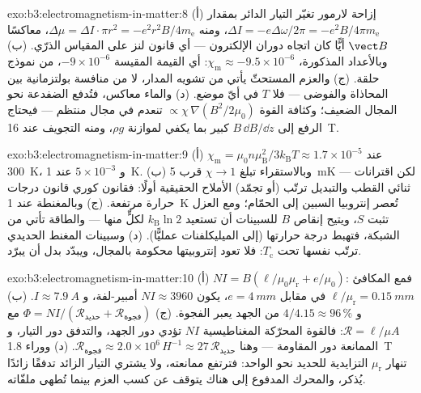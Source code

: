 \begin{solution}{exo:b3:electromagnetism-in-matter:8}
(أ) إزاحة لارمور تغيّر التيار الدائر بمقدار $\Delta I
= -e\Delta\omega/2\pi = -e^2B/4\pi m_{\text{e}}$، ومنه
$\Delta\mu = \Delta I\cdot\pi r^2 = -e^2r^2B/4m_{\text{e}}$،
معاكسًا $\vect B$ أيًّا كان اتجاه دوران الإلكترون ---
أي قانون لنز على المقياس الذرّي. (ب) وبالأعداد المذكورة،
$\chi_{\text{m}} \approx -9.5\times10^{-6}$: أي القيمة المقيسة
$-9\times10^{-6}$، من نموذج حلقة. (ج) والعزم المستحثّ
يأتي من تشويه المدار، لا من منافسة بولتزمانية
بين المحاذاة والفوضى --- فلا $T$ في أيّ موضع. (د) والماء
معاكس، فتُدفع الضفدعة نحو المجال الضعيف؛ وكثافة القوة
$\propto \chi\,\nabla(B^2/2\mu_0)$ تنعدم في مجال منتظم
--- فيحتاج الرفع إلى $B\,\dd B/\dd z$ كبير بما يكفي لموازنة
$\rho g$، ومنه التجويف عند \qty{16}{T}.
\end{solution}

\begin{solution}{exo:b3:electromagnetism-in-matter:9}
(أ) $\chi_{\text{m}} = \mu_0n\mu_{\text{B}}^2/3k_{\text{B}}T
\approx 1.7\times10^{-5}$ عند \qty{300}{K}، و $5\times10^{-3}$ عند
\qty{1}{K}. (ب) وبالاستقراء تبلغ $\chi \to 1$ قرب \qty{5}{mK} ---
لكن اقترانات ثنائي القطب والتبديل ترتّب (أو تجمّد) الأملاح الحقيقية
أولًا: فقانون كوري قانون درجات حرارة مرتفعة. (ج) وبالمغنطة عند
\qty{1}{K} تُعصر إنتروبيا السبين إلى الحمّام؛ ومع
العزل تثبت $S$، ويتيح إنقاص $B$ للسبينات أن تستعيد
$k_{\text{B}}\ln 2$ لكلٍّ منها --- والطاقة تأتي من
الشبكة، فتهبط درجة حرارتها (إلى الميليكلفنات عمليًّا). (د)
وسبينات المغنط الحديدي ترتّب نفسها تحت $T_{\text{c}}$: فلا تعود
إنتروبيتها محكومة بالمجال، ويبدّد  بدل أن يبرّد.
\end{solution}

\begin{solution}{exo:b3:electromagnetism-in-matter:10}
(أ) $NI = B(\ell/\mu_0\mu_{\text{r}} + e/\mu_0)$: فمع المكافئ
$\ell/\mu_{\text{r}} = \qty{0.15}{mm}$ في مقابل $e =
\qty{4}{mm}$، يكون $NI \approx 3960$ أمبير-لفة، و $I \approx
\qty{7.9}{A}$. (ب) و $4/4.15 \approx 96\,\%$ من الجهد يعبر
الفجوة. (ج) $\Phi = NI/(\mathcal R_{\text{حديد}} +
\mathcal R_{\text{فجوة}})$ مع $\mathcal R = \ell/\mu A$:
فالقوة المحرّكة المغناطيسية $NI$ تؤدي دور الجهد، والتدفق دور التيار، و
الممانعة دور المقاومة --- وهنا $\mathcal R_{\text{فجوة}}
\approx 2.0\times10^{6}\,\unit{H^{-1}} \approx
27\,\mathcal R_{\text{حديد}}$. (د) ووراء \qty{1.8}{T} تنهار
$\mu_{\text{r}}$ التزايدية للحديد نحو الواحد: فترتفع ممانعته،
ولا يشتري التيار الزائد تدفقًا زائدًا يُذكر، والمحرك المدفوع
إلى هناك يتوقف عن كسب العزم بينما تُطهى ملفّاته.
\end{solution}


